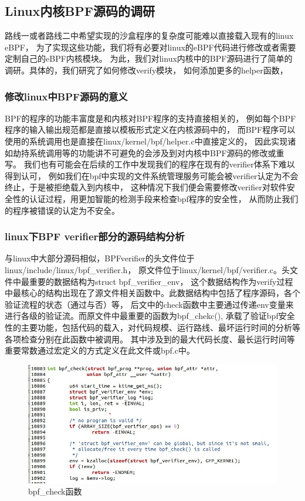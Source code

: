 \documentclass[AutoFakeBold,a4paper]{ctexart}
\begin{document}
\subsection{Linux内核BPF源码的调研}
路线一或者路线二中希望实现的沙盒程序的复杂度可能难以直接载入现有的linux eBPF，
为了实现这些功能，我们将有必要对linux的eBPF代码进行修改或者需要定制自己的eBPF内核模块。
为此，我们对linux内核中的BPF源码进行了简单的调研。具体的，我们研究了如何修改verify模块，
如何添加更多的helper函数，
\subsubsection{修改linux中BPF源码的意义}
BPF的程序的功能丰富度是和内核对BPF程序的支持直接相关的，
例如每个BPF程序的输入输出规范都是直接以模板形式定义在内核源码中的，
而BPF程序可以使用的系统调用也是直接在linux/kernel/bpf/helper.c中直接定义的，
因此实现诸如劫持系统调用等的功能讲不可避免的会涉及到对内核中BPF源码的修改或重写。
我们也有可能会在后续的工作中发现我们的程序在现有的verifier体系下难以得到认可，
例如我们在bpf中实现的文件系统管理服务可能会被verifier认定为不会终止，于是被拒绝载入到内核中，
这种情况下我们便会需要修改verifier对软件安全性的认证过程，用更加智能的检测手段来检查bpf程序的安全性，
从而防止我们的程序被错误的认定为不安全。
\subsubsection{linux下BPF verifier部分的源码结构分析}
与linux中大部分源码相似，BPFverifier的头文件位于linux/include/linux/bpf_verifier.h，
原文件位于linux/kernel/bpf/verifier.c。头文件中最重要的数据结构为struct bpf_verifier_env，
这个数据结构作为verify过程中最核心的结构出现在了源文件相关函数中。此数据结构中包括了程序源码，各个验证流程的状态（通过与否）等，
后文中的check函数中主要通过传递env变量来进行各级的验证流。而原文件中最重要的函数为bpf_chekc(),
承载了验证bpf安全性的主要功能，包括代码的载入，对代码规模、运行路线、最坏运行时间的分析等各项检查分别在此函数中被调用。
其中涉及到的最大代码长度、最长运行时间等重要常数通过宏定义的方式定义在此文件或bpf.c中。
\begin{figure}[H]
    \centering
    \includegraphics[width=0.7\columnwidth]{../LvHongtao/pic_2.jpg}
    \caption{bpf_check函数}
\end{figure}
\end{document}

